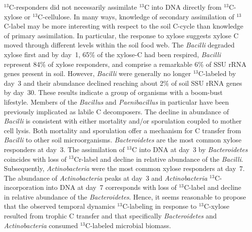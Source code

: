 $^{13}$C-responders did not necessarily assimilate $^{13}$C into DNA directly
from $^{13}$C-xylose or $^{13}$C-cellulose. In many ways, knowledge of
secondary assimilation of $^{13}$C-label may be more interesting with respect
to the soil C-cycle than knowledge of primary assimilation. In particular, the
response to xylose suggests xylose C moved through different levels within the
soil food web. The \textit{Bacilli} degraded xylose first and by day~1, 65\% of
the xylose-C had been respired, \textit{Bacilli} represent 84\% of xylose
responders, and comprise a remarkable 6\% of SSU rRNA genes present in soil.
However, \textit{Bacilli} were generally no longer $^{13}$C-labeled by day~3
and their abundance declined reaching about 2\% of soil SSU rRNA genes by
day~30. These results indicate a group of organisms with a boom-bust
lifestyle. Members of the \textit{Bacillus} \citep{Cleveland2007} and \textit{Paenibacillus} in
particular \citep{Verastegui_2014} have been previously implicated as labile C decomposers. The
decline in abundance of \textit{Bacilli} is consistent with either mortality
and/or sporulation coupled to mother cell lysis. Both mortality and sporulation
offer a mechanism for C transfer from \textit{Bacilli} to other soil
microorganisms. \textit{Bacteroidetes} are the most common xylose responders at
day~3. The assimilation of  $^{13}$C into DNA at day~3 by
\textit{Bacteroidetes} coincides with loss of $^{13}$Cr-label and decline in
relative abundance of the \textit{Bacilli}. Subsequently,
\textit{Actinobacteria} were the most common xylose responders at day~7. The
abundance of \textit{Actinobacteria} peaks at day~3 and \textit{Actinobacteria}
$^{13}$C-incorporation into DNA at day~7 corresponds with loss of
$^{13}$C-label and decline in relative abundance of the \textit{Bacteroidetes}.
Hence, it seems reasonable to propose that the observed temporal dynamics
$^{13}$C-labeling in response to $^{13}$C-xylose resulted from trophic
C transfer and that specifically \textit{Bacteroidetes} and
\textit{Actinobacteria} consumed $^{13}$C-labeled microbial biomass. 

